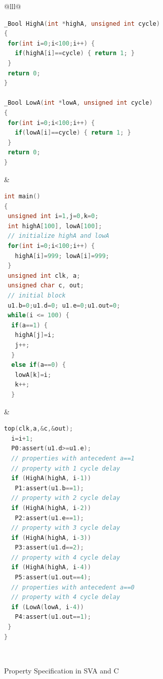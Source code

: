 \begin{figure}[bth]
\small
\begin{center}
\begin{tabular}{@{}lll@{}}
\hline
\begin{lstlisting}[boxpos=t,mathescape=true,language=C,basicstyle=\scriptsize\ttfamily]
_Bool HighA(int *highA, unsigned int cycle)
{
 for(int i=0;i<100;i++) { 
   if(highA[i]==cycle) { return 1; }
 }
 return 0;
} 

_Bool LowA(int *lowA, unsigned int cycle)
{
 for(int i=0;i<100;i++) { 
   if(lowA[i]==cycle) { return 1; }
 }
 return 0;
} 
\end{lstlisting}
&
\begin{lstlisting}[boxpos=t,mathescape=true,language=C,basicstyle=\scriptsize\ttfamily]
int main() 
{
 unsigned int i=1,j=0,k=0;
 int highA[100], lowA[100];
 // initialize highA and lowA
 for(int i=0;i<100;i++) { 
   highA[i]=999; lowA[i]=999;
 }
 unsigned int clk, a;
 unsigned char c, out;
 // initial block 
 u1.b=0;u1.d=0; u1.e=0;u1.out=0; 
 while(i <= 100) {
  if(a==1) {  
   highA[j]=i; 
   j++;
  } 
  else if(a==0) {
   lowA[k]=i;
   k++;
  }
\end{lstlisting}
& 
\begin{lstlisting}[boxpos=t,mathescape=true,language=C,basicstyle=\scriptsize\ttfamily]
  top(clk,a,&c,&out);
  i=i+1; 
  P0:assert(u1.d>=u1.e);
  // properties with antecedent a==1 
  // property with 1 cycle delay
  if (HighA(highA, i-1)) 
   P1:assert(u1.b==1);
  // property with 2 cycle delay
  if (HighA(highA, i-2))
   P2:assert(u1.e==1); 
  // property with 3 cycle delay
  if (HighA(highA, i-3))
   P3:assert(u1.d==2); 
  // property with 4 cycle delay
  if (HighA(highA, i-4))
   P5:assert(u1.out==4); 
  // properties with antecedent a==0
  // property with 4 cycle delay
  if (LowA(lowA, i-4)) 
   P4:assert(u1.out==1);
 }
}
\end{lstlisting}\\
\hline
\end{tabular}
	\caption{Property Specification in SVA and C}
\label{fig:sva}
\end{center}
\end{figure}

